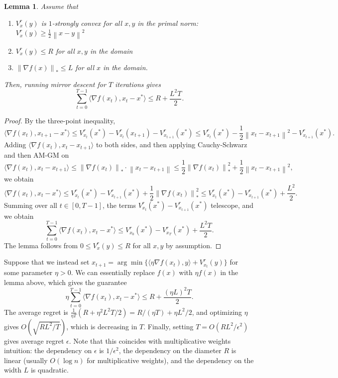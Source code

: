 \documentclass{article}
\newtheorem{lemma}[theorem]{Lemma}
\begin{document}
\begin{lemma}
Assume that
 \begin{enumerate}
 \item $V_x^r(y)$ is $1$-strongly convex for all $x,y$ in the primal norm: $V_x^r(y)\ge\frac12\left\lVert x-y\right\rVert^2$
 \item $V_x^r(y) \le R$ for all $x,y$ in the domain
 \item $\left\lVert\nabla f(x)\right\rVert_*\le L$ for all $x$ in the domain.
 \end{enumerate}
Then, running mirror descent for $T$ iterations gives
\[ \sum_{t=0}^{T-1}\langle\nabla f(x_t), x_t-x^*\rangle \le R+ \frac{L^2T}2 .\]
\end{lemma}
\begin{proof}
By the three-point inequality,
\[ \langle\nabla f(x_t), x_{t+1}-x^*\rangle \le V_{x_t}^r(x^*) - V_{x_t}^r(x_{t+1}) - V_{x_{t+1}}^r(x^*) \le V_{x_t}^r(x^*) - \frac12\left\lVert x_t-x_{t+1}\right\rVert^2 - V_{x_{t+1}}^r(x^*)  . \]
Adding $\langle\nabla f(x_t),x_t-x_{t+1}\rangle$ to both sides, and then applying Cauchy-Schwarz and then AM-GM on
\[ \langle\nabla f(x_t),x_t-x_{t+1}\rangle \le \left\lVert\nabla f(x_t)\right\rVert_* \cdot \left\lVert x_t-x_{t+1}\right\rVert \le \frac12\left\lVert\nabla f(x_t)\right\rVert_*^2 + \frac12\left\lVert x_t-x_{t+1}\right\rVert^2 ,\]
we obtain
\[ \langle\nabla f(x_t), x_t-x^*\rangle \le V_{x_t}^r(x^*)-V_{x_{t+1}}^r(x^*) + \frac12\left\lVert\nabla f(x_t)\right\rVert_*^2 \le V_{x_t}^r(x^*)-V_{x_{t+1}}^r(x^*) + \frac{L^2}2 .\]
Summing over all $t\in[0,T-1]$, the terms $V_{x_t}^r(x^*)-V_{x_{t+1}}^r(x^*)$ telescope, and we obtain
\[ \sum_{t=0}^{T-1}\langle\nabla f(x_t), x_t-x^*\rangle \le V_{x_0}^r(x^*)-V_{x_T}^r(x^*) + \frac{L^2T}2 .\]
The lemma follows from $0 \le V_x^r(y)\le R$ for all $x,y$ by assumption.
\end{proof}
Suppose that we instead set $x_{t+1}=\arg\min\{\langle\eta\nabla f(x_t),y\rangle+V_{x_t}^r(y)\}$ for some parameter $\eta>0$. We can essentially replace $f(x)$ with $\eta f(x)$ in the lemma above, which gives the guarantee
\[ \eta \sum_{t=0}^{T-1}\langle\nabla f(x_t), x_t-x^*\rangle \le R + \frac{(\eta L)^2T}2 .\]
The average regret is $\frac1{\eta T}(R+\eta^2L^2T/2) = R/(\eta T) + \eta L^2/2$, and optimizing $\eta$ gives $O(\sqrt{RL^2/T})$, which is decreasing in $T$. Finally, setting $T=O(RL^2/\epsilon^2)$ gives average regret $\epsilon$. Note that this coincides with multiplicative weights intuition: the dependency on $\epsilon$ is $1/\epsilon^2$, the dependency on the diameter $R$ is linear (usually $O(\log n)$ for multiplicative weights), and the dependency on the width $L$ is quadratic.
\end{document}
